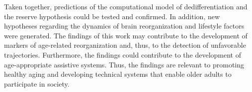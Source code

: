 Taken together, predictions of the computational model of dedifferentiation and the reserve hypothesis could be tested and confirmed. In addition, new hypotheses regarding the dynamics of brain reorganization and lifestyle factors were generated. The findings of this work may contribute to the development of markers of age-related reorganization and, thus, to the detection of unfavorable trajectories. Furthermore, the findings could contribute to the development of age-appropriate assistive systems. Thus, the findings are relevant to promoting healthy aging and developing technical systems that enable older adults to participate in society.




